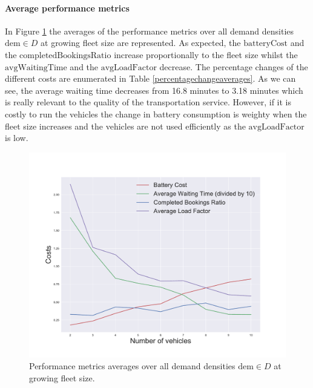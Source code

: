 \documentclass[12pt,a4paper]{article}
\begin{document}
\paragraph{Average performance metrics} 
In Figure \ref{averages} the averages of the performance metrics over all demand densities $\text{dem} \in D$ at growing fleet size are represented. As expected, the $\text{batteryCost}$ and the $\text{completedBookingsRatio}$ increase proportionally to the fleet size whilst the $\text{avgWaitingTime}$ and the $\text{avgLoadFactor}$ decrease. The percentage changes of the different costs are enumerated in Table \ref{percentagechangeaverages}. As we can see, the average waiting time decreases from 16.8 minutes to 3.18 minutes which is really relevant to the quality of the transportation service. However, if it is costly to run the vehicles the change in battery consumption is weighty when the fleet size increases and the vehicles are not used efficiently as the $\text{avgLoadFactor}$ is low.

\begin{figure}
  \centering
\includegraphics[scale=0.5]{./images/vehicleimpact.pdf}
  \caption{Performance metrics averages over all demand densities $\text{dem} \in D$ at growing fleet size.}
\label{averages}
\end{figure}
\end{document}
